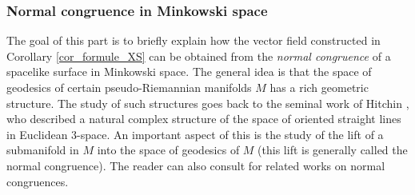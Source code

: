\documentclass[JEP,XML,SOM,Unicode,NoEqCountersInSection, NoFloatCountersInSection,published]{cedram}
\theoremstyle{plain}
\theoremstyle{definition}
\begin{document}
\subsubsection{Normal congruence in Minkowski space}
The goal of this part is to briefly explain how the vector field constructed in Corollary \ref{cor_formule_XS} can be obtained from the \emph{normal congruence} of a spacelike surface in Minkowski space. The general idea is that the space of geodesics of certain pseudo-Riemannian manifolds $M$ has a rich geometric structure. The study of such structures goes back to the seminal work of Hitchin \cite{Monopole_Hitchin}, who described a natural complex structure of the space of oriented straight lines in Euclidean $3$-space. An important aspect of this is the study of the lift of a submanifold in $M$ into the space of geodesics of $M$ (this lift is generally called the normal congruence). The reader can also consult \cite{ML_in_tangent_bundle, Anciaux_space_of_geodesic, Emam_Seppi1} for related works on normal congruences.
\end{document}

